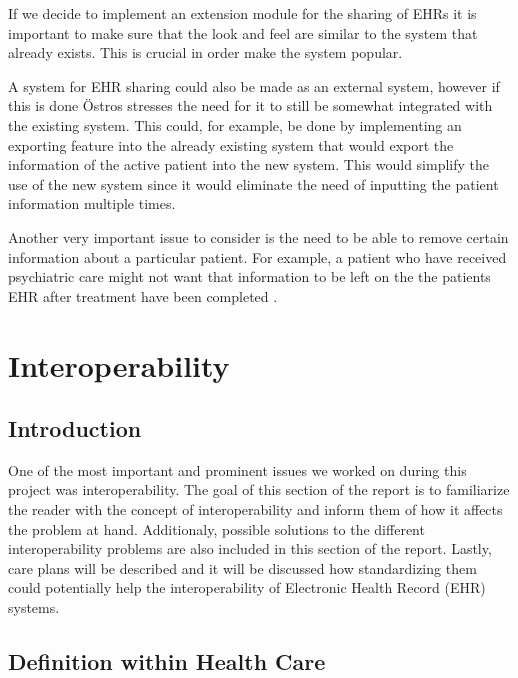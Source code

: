 \documentclass[14pt]{article}
\begin{document}
If we decide to implement an extension module for the sharing of \glspl{EHR} it is important to make sure that the look and feel are similar to the system that already exists. This is crucial in order make the system popular. 

A system for \gls{EHR} sharing could also be made as an external system, however if this is done Östros\cite{EPJ2} stresses the need for it to still be somewhat integrated with the existing system. This could, for example, be done by implementing an exporting feature into the already existing system that would export the information of the active patient into the new system. This would simplify the use of the new system since it would eliminate the need of inputting the patient information multiple times.

Another very important issue to consider is the need to be able to remove certain information about a particular patient. For example, a patient who have received psychiatric care might not want that information to be left on the the patients \gls{EHR} after treatment have been completed \cite{EPJ1}.


\newpage

\section{Interoperability}
\label{sec:Interoperability}

\subsection{Introduction} 
\label{sec:interopIntro}
One of the most important and prominent issues we worked on during this project was interoperability. The goal of this section of the report is to familiarize the reader with the concept of interoperability and inform them of how it affects the problem at hand. Additionaly, possible solutions to the different interoperability problems are also included in this section of the report.  Lastly, care plans will be described and it will be discussed how standardizing them could potentially help the interoperability of Electronic Health Record (\gls{EHR}) systems.

\subsection{Definition within Health Care} 
\label{sec:interopDefinition}

\end{document}
